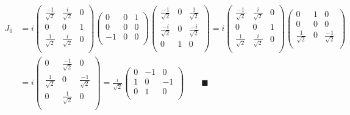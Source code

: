 \documentclass{article}
\begin{document}
\begin{align*}
  J_0 & =i\begin{pmatrix}
    \frac{-1}{\sqrt{2}} & \frac{i}{\sqrt{2}} & 0 \\
    0                   & 0                  & 1 \\
    \frac{1}{\sqrt{2}}  & \frac{i}{\sqrt{2}} & 0 \\
  \end{pmatrix}\begin{pmatrix}
    0  & 0 & 1 \\
    0  & 0 & 0 \\
    -1 & 0 & 0 \\
  \end{pmatrix}\begin{pmatrix}
    \frac{-1}{\sqrt{2}} & 0 & \frac{1}{\sqrt{2}}  \\
    \frac{-i}{\sqrt{2}} & 0 & \frac{-i}{\sqrt{2}} \\
    0                   & 1 & 0                   \\
  \end{pmatrix}=i\begin{pmatrix}
    \frac{-1}{\sqrt{2}} & \frac{i}{\sqrt{2}} & 0 \\
    0                   & 0                  & 1 \\
    \frac{1}{\sqrt{2}}  & \frac{i}{\sqrt{2}} & 0 \\
  \end{pmatrix}\begin{pmatrix}
    0                  & 1 & 0                   \\
    0                  & 0 & 0                   \\
    \frac{1}{\sqrt{2}} & 0 & \frac{-1}{\sqrt{2}} \\
  \end{pmatrix} \\
      & =i\begin{pmatrix}
    0                  & \frac{-1}{\sqrt{2}} & 0                   \\
    \frac{1}{\sqrt{2}} & 0                   & \frac{-1}{\sqrt{2}} \\
    0                  & \frac{1}{\sqrt{2}}  & 0                   \\
  \end{pmatrix}=\frac{i}{\sqrt{2}}\begin{pmatrix}
    0 & -1 & 0  \\
    1 & 0  & -1 \\
    0 & 1  & 0  \\
  \end{pmatrix}\qquad\blacksquare
\end{align*}
\end{document}

